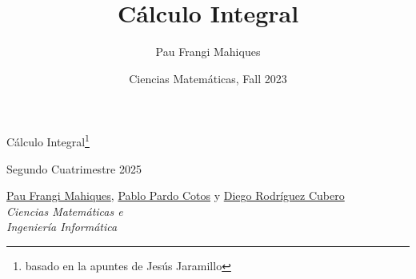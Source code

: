 \documentclass[a4paper,11pt,final]{article}
\title{Cálculo Integral}
\date{Ciencias Matemáticas, Fall 2023}
\author{Pau Frangi Mahiques}
\begin{document}
\begin{titlepage}
    \centering\Large\null\vfill

    {\Huge Cálculo Integral\footnote{basado en la apuntes de Jesús Jaramillo}}\\ 
    \vspace{1em}

    Segundo Cuatrimestre 2025\\
    \vskip8cm

    \href{https://github.com/Pau-Frangi}{Pau Frangi Mahiques}, \href{https://github.com/PabloPC05}{Pablo Pardo Cotos} y \href{https://github.com/DIEGOROCU}{Diego Rodríguez Cubero}\\

    \emph{Ciencias Matemáticas e\\Ingeniería Informática}\\
    \vskip4cm
\end{titlepage}

\newpage
\pagestyle{plain}    
\tableofcontents
\newpage


\end{document}
